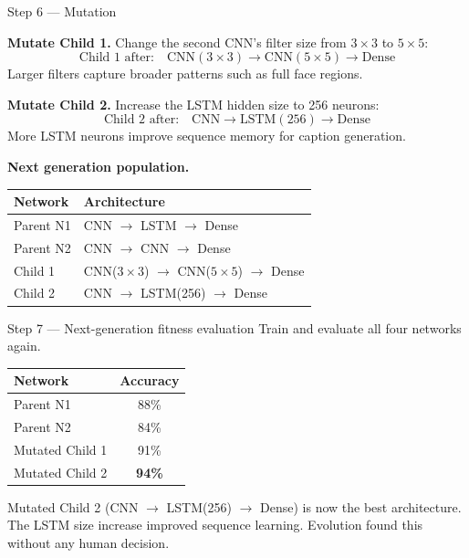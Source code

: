 \documentclass[a4paper,11pt]{article}
\begin{document}
\begin{worked}{Step 6 --- Mutation}

\begin{steps}
  \item \textbf{Mutate Child 1.}
        Change the second CNN's filter size from $3\times3$ to $5\times5$:
        \[
          \text{Child 1 after:}\quad
          \text{CNN}(3\times3) \to \text{CNN}(5\times5) \to \text{Dense}
        \]
        Larger filters capture broader patterns such as full face regions.

  \item \textbf{Mutate Child 2.}
        Increase the LSTM hidden size to 256 neurons:
        \[
          \text{Child 2 after:}\quad
          \text{CNN} \to \text{LSTM}(256) \to \text{Dense}
        \]
        More LSTM neurons improve sequence memory for caption generation.

  \item \textbf{Next generation population.}
        \begin{center}\small
        \begin{tabular}{@{}ll@{}}
        \toprule
        \textbf{Network} & \textbf{Architecture} \\
        \midrule
        Parent N1  & CNN $\to$ LSTM $\to$ Dense \\
        Parent N2  & CNN $\to$ CNN $\to$ Dense \\
        Child 1    & CNN($3\times3$) $\to$ CNN($5\times5$) $\to$ Dense \\
        Child 2    & CNN $\to$ LSTM(256) $\to$ Dense \\
        \bottomrule
        \end{tabular}
        \end{center}
\end{steps}
\end{worked}

\begin{worked}{Step 7 --- Next-generation fitness evaluation}
Train and evaluate all four networks again.

\begin{center}\small
\begin{tabular}{@{}lc@{}}
\toprule
\textbf{Network} & \textbf{Accuracy} \\
\midrule
Parent N1       & 88\% \\
Parent N2       & 84\% \\
Mutated Child 1 & 91\% \\
Mutated Child 2 & \textbf{94\%} \\
\bottomrule
\end{tabular}
\end{center}

Mutated Child 2 (CNN $\to$ LSTM(256) $\to$ Dense) is now the best
architecture.
The LSTM size increase improved sequence learning.
Evolution found this without any human decision.
\end{worked}
\end{document}

